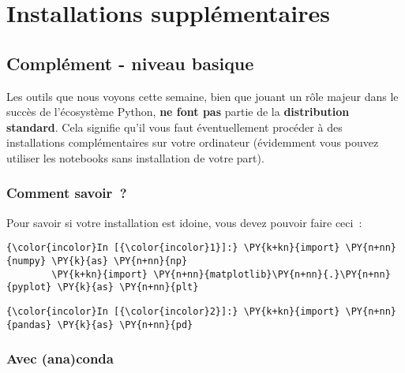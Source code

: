     
    
    
    

    

    \hypertarget{installations-suppluxe9mentaires}{%
\section{Installations
supplémentaires}\label{installations-suppluxe9mentaires}}

    \hypertarget{compluxe9ment---niveau-basique}{%
\subsection{Complément - niveau
basique}\label{compluxe9ment---niveau-basique}}

    Les outils que nous voyons cette semaine, bien que jouant un rôle majeur
dans le succès de l'écosystème Python, \textbf{ne font pas} partie de la
\textbf{distribution standard}. Cela signifie qu'il vous faut
éventuellement procéder à des installations complémentaires sur votre
ordinateur (évidemment vous pouvez utiliser les notebooks sans
installation de votre part).

    \hypertarget{comment-savoir}{%
\subsubsection{Comment savoir~?}\label{comment-savoir}}

    Pour savoir si votre installation est idoine, vous devez pouvoir faire
ceci~:

    \begin{Verbatim}[commandchars=\\\{\}]
{\color{incolor}In [{\color{incolor}1}]:} \PY{k+kn}{import} \PY{n+nn}{numpy} \PY{k}{as} \PY{n+nn}{np}
        \PY{k+kn}{import} \PY{n+nn}{matplotlib}\PY{n+nn}{.}\PY{n+nn}{pyplot} \PY{k}{as} \PY{n+nn}{plt}
\end{Verbatim}


    \begin{Verbatim}[commandchars=\\\{\}]
{\color{incolor}In [{\color{incolor}2}]:} \PY{k+kn}{import} \PY{n+nn}{pandas} \PY{k}{as} \PY{n+nn}{pd}
\end{Verbatim}


    \hypertarget{avec-anaconda}{%
\subsubsection{Avec (ana)conda}\label{avec-anaconda}}

